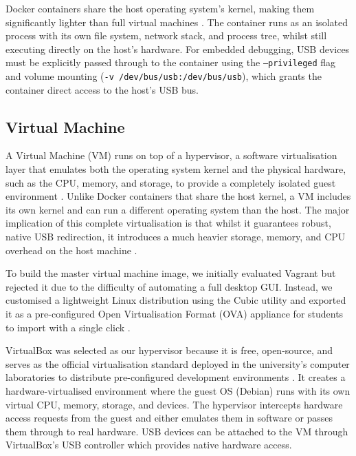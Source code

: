 Docker containers share the host operating system's kernel, making them significantly lighter than full virtual machines \cite{rosen_namespaces_slides}. The container runs as an isolated process with its own file system, network stack, and process tree, whilst still executing directly on the host's hardware. For embedded debugging, USB devices must be explicitly passed through to the container using the \texttt{--privileged} flag and volume mounting (\texttt{-v /dev/bus/usb:/dev/bus/usb}), which grants the container direct access to the host's USB bus.

\subsection{Virtual Machine}

A Virtual Machine (VM) runs on top of a hypervisor, a software virtualisation layer that emulates both the operating system kernel and the physical hardware, such as the CPU, memory, and storage, to provide a completely isolated guest environment \cite{smith_virtual_machines}. Unlike Docker containers that share the host kernel, a VM includes its own kernel and can run a different operating system than the host. The major implication of this complete virtualisation is that whilst it guarantees robust, native USB redirection, it introduces a much heavier storage, memory, and CPU overhead on the host machine \cite{smith_virtual_machines}.

To build the master virtual machine image, we initially evaluated Vagrant but rejected it due to the difficulty of automating a full desktop GUI. Instead, we customised a lightweight Linux distribution using the Cubic utility and exported it as a pre-configured Open Virtualisation Format (OVA) appliance for students to import with a single click \cite{cubic_github}.

VirtualBox was selected as our hypervisor because it is free, open-source, and serves as the official virtualisation standard deployed in the university's computer laboratories to distribute pre-configured development environments \cite{kelhala:2024}. It creates a hardware-virtualised environment where the guest OS (Debian) runs with its own virtual CPU, memory, storage, and devices. The hypervisor intercepts hardware access requests from the guest and either emulates them in software or passes them through to real hardware. USB devices can be attached to the VM through VirtualBox's USB controller which provides native hardware access.


